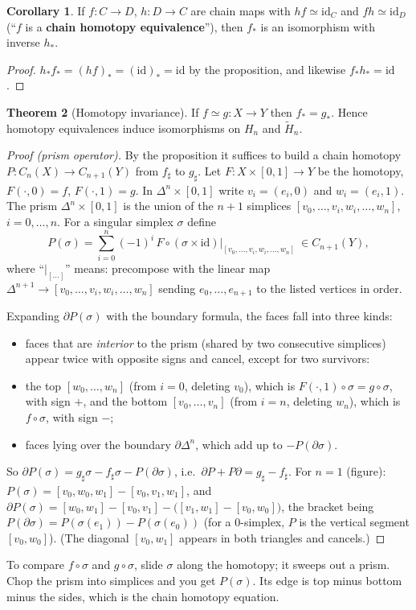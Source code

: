 \documentclass[11pt]{article}
\newcommand{\Hred}{\tilde H}
\newcommand{\fig}[2]{\begin{center}\resizebox{#2}{!}{}\end{center}}
\theoremstyle{definition}
\newtheorem{thm}{Theorem}[section]
\newtheorem{cor}[thm]{Corollary}
\begin{document}
\begin{cor}
If $f:C\to D$, $h:D\to C$ are chain maps with $hf\simeq\mathrm{id}_C$ and $fh\simeq\mathrm{id}_D$ (``$f$ is a \textbf{chain homotopy equivalence}''), then $f_*$ is an isomorphism with inverse $h_*$.
\end{cor}
\begin{proof}
$h_*f_*=(hf)_*=(\mathrm{id})_*=\mathrm{id}$ by the proposition, and likewise $f_*h_*=\mathrm{id}$.
\end{proof}

\begin{thm}[Homotopy invariance]
If $f\simeq g:X\to Y$ then $f_*=g_*$. Hence homotopy equivalences induce isomorphisms on $H_n$ and $\Hred_n$.
\end{thm}
\begin{proof}[Proof (prism operator)]
By the proposition it suffices to build a chain homotopy $P:C_n(X)\to C_{n+1}(Y)$ from $f_\sharp$ to $g_\sharp$. Let $F:X\times[0,1]\to Y$ be the homotopy, $F(\cdot,0)=f$, $F(\cdot,1)=g$. In $\Delta^n\times[0,1]$ write $v_i=(e_i,0)$ and $w_i=(e_i,1)$. The prism $\Delta^n\times[0,1]$ is the union of the $n+1$ simplices $[v_0,\dots,v_i,w_i,\dots,w_n]$, $i=0,\dots,n$. For a singular simplex $\sigma$ define
\[P(\sigma)=\sum_{i=0}^n(-1)^i\,F\circ(\sigma\times\mathrm{id})\big|_{[v_0,\dots,v_i,w_i,\dots,w_n]}\ \in C_{n+1}(Y),\]
where ``$|_{[\dots]}$'' means: precompose with the linear map $\Delta^{n+1}\to[v_0,\dots,v_i,w_i,\dots,w_n]$ sending $e_0,\dots,e_{n+1}$ to the listed vertices in order.
\fig{prism}{0.5\textwidth}
Expanding $\partial P(\sigma)$ with the boundary formula, the faces fall into three kinds:
\begin{itemize}
\item faces that are \emph{interior} to the prism (shared by two consecutive simplices) appear twice with opposite signs and cancel, except for two survivors:
\item the top $[w_0,\dots,w_n]$ (from $i=0$, deleting $v_0$), which is $F(\cdot,1)\circ\sigma=g\circ\sigma$, with sign $+$, and the bottom $[v_0,\dots,v_n]$ (from $i=n$, deleting $w_n$), which is $f\circ\sigma$, with sign $-$;
\item faces lying over the boundary $\partial\Delta^n$, which add up to $-P(\partial\sigma)$.
\end{itemize}
So $\partial P(\sigma)=g_\sharp\sigma-f_\sharp\sigma-P(\partial\sigma)$, i.e.\ $\partial P+P\partial=g_\sharp-f_\sharp$. For $n=1$ (figure): $P(\sigma)=[v_0,w_0,w_1]-[v_0,v_1,w_1]$, and $\partial P(\sigma)=[w_0,w_1]-[v_0,v_1]-\big([v_1,w_1]-[v_0,w_0]\big)$, the bracket being $P(\partial\sigma)=P(\sigma(e_1))-P(\sigma(e_0))$ (for a $0$-simplex, $P$ is the vertical segment $[v_0,w_0]$). (The diagonal $[v_0,w_1]$ appears in both triangles and cancels.)
\end{proof}
\begin{intuition}
To compare $f\circ\sigma$ and $g\circ\sigma$, slide $\sigma$ along the homotopy; it sweeps out a prism. Chop the prism into simplices and you get $P(\sigma)$. Its edge is top minus bottom minus the sides, which is the chain homotopy equation.
\end{intuition}
\end{document}

